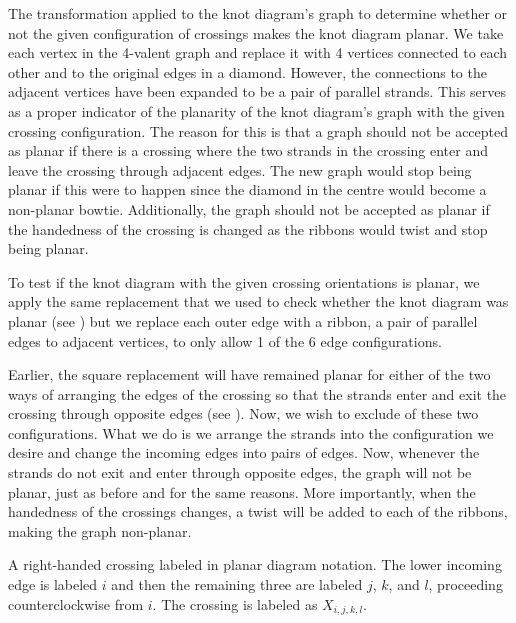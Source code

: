 \begin{paper}
{The transformation applied to the knot diagram's graph to determine whether or
not the given configuration of crossings makes the knot diagram planar.
We take each vertex in the 4-valent graph and replace it with 4 vertices
connected to each other and to the original edges in a diamond.
However, the connections to the adjacent vertices have been expanded to be a
pair of parallel strands.
This serves as a proper indicator of the planarity of the knot diagram's graph
with the given crossing configuration.
The reason for this is that a graph should not be accepted as planar if there is
a crossing where the two strands in the crossing enter and leave the crossing
through adjacent edges.
The new graph would stop being planar if this were to happen since the diamond
in the centre would become a non-planar bowtie.
Additionally, the graph should not be accepted as planar if the handedness of
the crossing is changed as the ribbons would twist and stop being planar.}

To test if the knot diagram with the given crossing orientations is planar, we
apply the same replacement that we used to check whether the knot diagram was
planar (see \figRibbon) but we replace each outer edge with a ribbon, a pair of
parallel edges to adjacent vertices, to only
allow 1 of the 6 edge configurations.

Earlier, the square replacement will have remained planar for either of the two
ways of arranging the edges of the crossing so that the strands enter and exit
the crossing through opposite edges (see \figGraph).
Now, we wish to exclude of these two configurations.
What we do is we arrange the strands into the configuration we desire and change
the incoming edges into pairs of edges.
Now, whenever the strands do not exit and enter through opposite edges, the
graph will not be planar, just as before and for the same reasons.
More importantly, when the handedness of the crossings changes, a twist will be
added to each of the ribbons, making the graph non-planar.

{A right-handed crossing labeled in planar diagram notation.
The lower incoming edge is labeled $i$ and then the remaining three are labeled
$j$, $k$, and $l$, proceeding counterclockwise from $i$.
The crossing is labeled as $X_{i,j,k,l}$.}


\end{paper}
